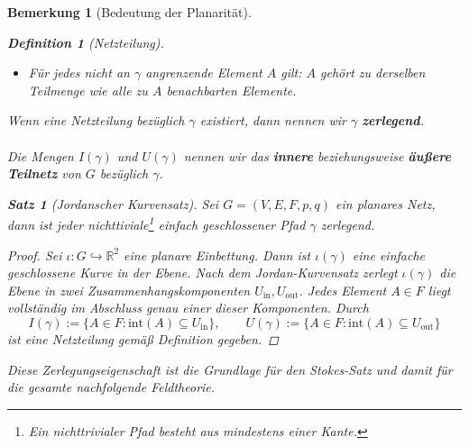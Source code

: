 \documentclass[11pt,a4paper,leqno]{report}
\newtheorem{proposition}{Satz}[chapter]
\newtheorem{definition}[theorem]{Definition}
\newtheorem{remark}[theorem]{Bemerkung}
\numberwithin{equation}{chapter}
\begin{document}
\begin{remark}[Bedeutung der Planarität]
\begin{definition}[Netzteilung]
\begin{itemize}
		\item Für jedes nicht an \(\gamma\) angrenzende Element \(A\) gilt:
		\(A\) gehört zu derselben Teilmenge wie alle zu \(A\) benachbarten
		Elemente.
	\end{itemize}
	Wenn eine Netzteilung bezüglich $\gamma$ existiert, dann nennen wir $\gamma$ \textbf{zerlegend}.\\
	\\
	Die Mengen \(I(\gamma)\) und \(U(\gamma)\) nennen wir das \textbf{innere}
	beziehungsweise \textbf{äußere Teilnetz} von \(G\) bezüglich \(\gamma\).
\end{definition}
\begin{proposition}[Jordanscher Kurvensatz]\label{prop: 13}
Sei \(G=(V,E,F,p,q)\) ein planares Netz, dann ist jeder nichttiviale\footnote{Ein nichttrivialer Pfad besteht aus mindestens einer Kante.} einfach geschlossener Pfad $\gamma$ zerlegend.	
\end{proposition}
\begin{proof}
	Sei \(\iota\colon G\hookrightarrow\mathbb{R}^2\) eine planare Einbettung.
	Dann ist \(\iota(\gamma)\) eine einfache geschlossene Kurve in der Ebene.
	Nach dem Jordan-Kurvensatz zerlegt \(\iota(\gamma)\) die Ebene in zwei
	Zusammenhangskomponenten \(U_{\mathrm{in}},U_{\mathrm{out}}\). Jedes
	Element \(A\in F\) liegt vollständig im Abschluss genau einer dieser
	Komponenten. Durch
	\[
	I(\gamma):=\{A\in F:\mathrm{int}(A)\subseteq U_{\mathrm{in}}\},\qquad
	U(\gamma):=\{A\in F:\mathrm{int}(A)\subseteq U_{\mathrm{out}}\}
	\]
	ist eine Netzteilung gemäß Definition gegeben.
\end{proof}
\noindent
Diese Zerlegungseigenschaft ist die
Grundlage für den Stokes-Satz und damit für die gesamte nachfolgende
Feldtheorie.
\end{remark}
\newpage
\end{document}
